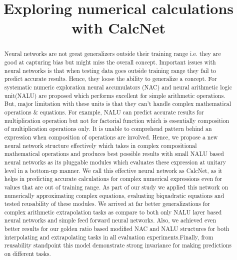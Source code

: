 \documentclass[conference]{IEEEtran}
\begin{document}
\title{Exploring numerical calculations with CalcNet}

\author{
\and
{}
}


\maketitle

\begin{abstract}

Neural networks are not great generalizers outside their training range i.e. they are good at capturing bias but might miss the overall concept. Important issues with neural networks is that when testing data goes outside training range they fail to predict accurate results. Hence, they loose the ability to generalize a concept. For systematic numeric exploration neural accumulators (NAC) and neural arithmetic logic unit(NALU) are proposed which performs excellent for simple arithmetic operations. But, major limitation with these units is that they can't handle complex mathematical operations \& equations. For example, NALU can predict accurate results for multiplication operation but not for factorial function which is essentially composition of multiplication operations only. It is unable to comprehend pattern behind an expression when composition of operations are involved.
Hence, we propose a new neural network structure effectively which takes in complex compositional mathematical operations and produces best possible results with small NALU based neural networks as its pluggable modules which evaluates these expression at unitary level in a bottom-up manner. We call this effective neural network as CalcNet, as it helps in predicting accurate calculations for complex numerical expressions even for values that are out of training range. As part of our study we applied this network on numerically approximating complex equations, evaluating biquadratic equations and tested reusability of these modules. We arrived at far better generalizations for complex arithmetic extrapolation tasks as compare to both only NALU layer based neural networks and simple feed forward neural networks. Also, we achieved even better results for our golden ratio based modified NAC and NALU structures for both interpolating and extrapolating tasks in all evaluation experiments.Finally, from reusability standpoint this model
demonstrate strong invariance for making predictions on different tasks.

\end{abstract}
\end{document}
